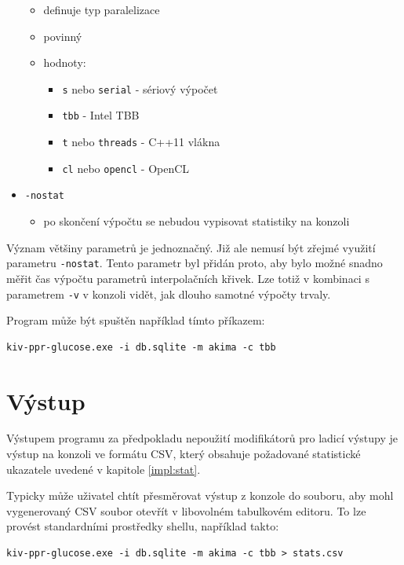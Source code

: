 \documentclass[]{thesiskiv}
\begin{document}
\begin{itemize}[noitemsep]
\begin{itemize}[noitemsep]
			\item definuje typ paralelizace
			\item povinný
			\item hodnoty:
				\begin{itemize}[noitemsep]
					\item \texttt{s} nebo \texttt{serial} - sériový výpočet
					\item \texttt{tbb} - Intel TBB
					\item \texttt{t} nebo \texttt{threads} - C++11 vlákna
					\item \texttt{cl} nebo \texttt{opencl} - OpenCL
				\end{itemize} 
		\end{itemize}
	\item \texttt{-nostat}
		\begin{itemize}[noitemsep]
			\item po skončení výpočtu se nebudou vypisovat statistiky na konzoli
		\end{itemize}
\end{itemize}

Význam většiny parametrů je jednoznačný. Již ale nemusí být zřejmé využití parametru \texttt{-nostat}. Tento parametr byl přidán proto, aby bylo možné snadno měřit čas výpočtu parametrů interpolačních křivek. Lze totiž v kombinaci s parametrem \texttt{-v} v konzoli vidět, jak dlouho samotné výpočty trvaly.

Program může být spuštěn například tímto příkazem:
\begin{verbatim}
kiv-ppr-glucose.exe -i db.sqlite -m akima -c tbb
\end{verbatim}

\section{Výstup}

Výstupem programu za předpokladu nepoužití modifikátorů pro ladicí výstupy je výstup na konzoli ve formátu CSV, který obsahuje požadované statistické ukazatele uvedené v kapitole \ref{impl:stat}.

Typicky může uživatel chtít přesměrovat výstup z konzole do souboru, aby mohl vygenerovaný CSV soubor otevřít v libovolném tabulkovém editoru. To lze provést standardními prostředky shellu, například takto:

\begin{verbatim}
kiv-ppr-glucose.exe -i db.sqlite -m akima -c tbb > stats.csv
\end{verbatim}
\end{document}
